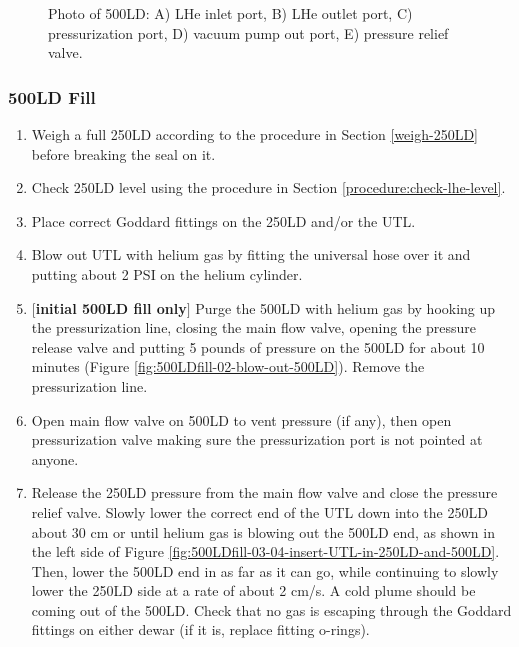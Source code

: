 \begin{figure}[!htbp]
\begin{minipage}{.50\textwidth}
 \caption{Photo of 500LD: A) LHe inlet port, B) LHe outlet port, C) pressurization port, D) vacuum pump out port, E) pressure relief valve.}
 \label{fig:500LD-photo}
 \end{minipage}
 \end{figure}




\subsubsection{500LD Fill}
\label{practical-op:500LDfill}
\begin{enumerate}
 \item Weigh a full 250LD according to the procedure in Section \ref{weigh-250LD} before breaking the seal on it.
 \item Check 250LD level using the procedure in Section \ref{procedure:check-lhe-level}.
 \item Place correct Goddard fittings on the 250LD and/or the UTL.
 \item Blow out UTL with helium gas by fitting the universal hose over it and putting about 2 PSI on the helium cylinder. \label{procedure:500LDfill-blowoutUTL}
 \item $[$\textbf{initial 500LD fill only}$]$ Purge the 500LD with helium gas by hooking up the pressurization line, closing the main flow valve, opening the pressure release valve and putting 5 pounds of pressure on the 500LD for about 10 minutes (Figure \ref{fig:500LDfill-02-blow-out-500LD}).  Remove the pressurization line. \label{procedure:500LDfill-purge500LD}%
 \item Open main flow valve on 500LD to vent pressure (if any), then open pressurization valve making sure the pressurization port is not pointed at anyone.
 \item Release the 250LD pressure from the main flow valve and close the pressure relief valve.  Slowly lower the correct end of the UTL down into the 250LD about 30 cm or until helium gas is blowing out the 500LD end, as shown in the left side of Figure \ref{fig:500LDfill-03-04-insert-UTL-in-250LD-and-500LD}.  Then, lower the 500LD end in as far as it can go, while continuing to slowly lower the 250LD side at a rate of about 2 cm/s.  A cold plume should be coming out of the 500LD.  Check that no gas is escaping through the Goddard fittings on either dewar (if it is, replace fitting o-rings). \label{procedure:insert-UTL-in-250LD}

\end{enumerate}

